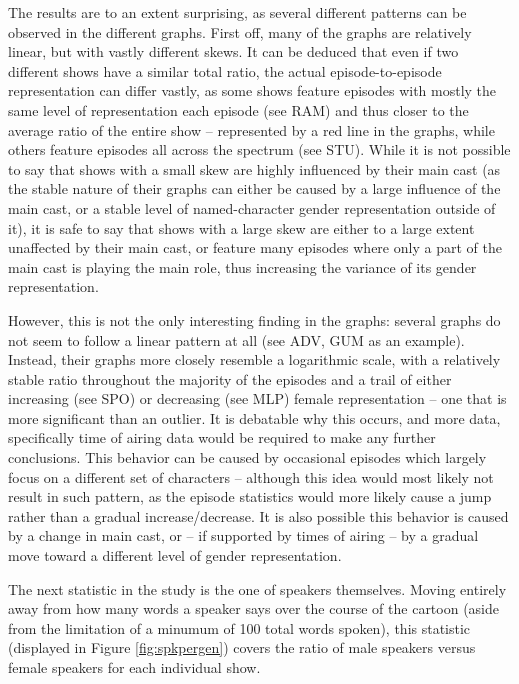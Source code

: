 \documentclass[a4paper, 11pt]{article}
\begin{document}
The results are to an extent surprising, as several different patterns can be observed in the different graphs. First off, many of the graphs are relatively linear, but with vastly different skews. It can be deduced that even if two different shows have a similar total ratio, the actual episode-to-episode representation can differ vastly, as some shows feature episodes with mostly the same level of representation each episode (see RAM) and thus closer to the average ratio of the entire show -- represented by a red line in the graphs, while others feature episodes all across the spectrum (see STU). While it is not possible to say that shows with a small skew are highly influenced by their main cast (as the stable nature of their graphs can either be caused by a large influence of the main cast, or a stable level of named-character gender representation outside of it), it is safe to say that shows with a large skew are either to a large extent unaffected by their main cast, or feature many episodes where only a part of the main cast is playing the main role, thus increasing the variance of its gender representation.

However, this is not the only interesting finding in the graphs: several graphs do not seem to follow a linear pattern at all (see ADV, GUM as an example). Instead, their graphs more closely resemble a logarithmic scale, with a relatively stable ratio throughout the majority of the episodes and a trail of either increasing (see SPO) or decreasing (see MLP) female representation -- one that is more significant than an outlier. It is debatable why this occurs, and more data, specifically time of airing data would be required to make any further conclusions. This behavior can be caused by occasional episodes which largely focus on a different set of characters -- although this idea would most likely not result in such pattern, as the episode statistics would more likely cause a jump rather than a gradual increase/decrease. It is also possible this behavior is caused by a change in main cast, or -- if supported by times of airing -- by a gradual move toward a different level of gender representation.

The next statistic in the study is the one of speakers themselves. Moving entirely away from how many words a speaker says over the course of the cartoon (aside from the limitation of a minumum of 100 total words spoken), this statistic (displayed in Figure \ref{fig:spkpergen}) covers the ratio of male speakers versus female speakers for each individual show.
\end{document}
